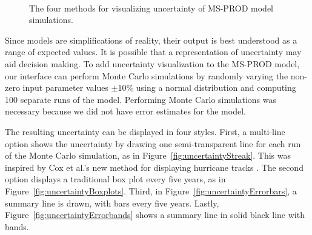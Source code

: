 \begin{figure}
\centering
	 \qquad
	 
	 \\
	
	  \qquad
	
	
	\caption{The four methods for visualizing uncertainty of MS-PROD model simulations.}
	\label{fig:uncertainty}
\end{figure}

Since models are simplifications of reality, their output is best understood as a range of expected values.  It is possible that a representation of uncertainty may aid decision making.  To add uncertainty visualization to the MS-PROD model, our interface can perform Monte Carlo simulations by randomly varying the non-zero input parameter values $\pm 10\%$ using a normal distribution and computing 100 separate runs of the model.  Performing Monte Carlo simulations was necessary because we did not have error estimates for the model.

The resulting uncertainty can be displayed in four styles.  First, a multi-line option shows the uncertainty by drawing one semi-transparent line for each run of the Monte Carlo simulation, as in Figure~\ref{fig:uncertaintyStreak}. This was inspired by Cox et al.'s new method for displaying hurricane tracks \cite{cox2013}.  The second option displays a traditional box plot every five years, as in Figure~\ref{fig:uncertaintyBoxplots}.  Third, in Figure~\ref{fig:uncertaintyErrorbars}, a summary line is drawn, with bars every five years.  Lastly, Figure~\ref{fig:uncertaintyErrorbands} shows a summary line in solid black line with bands.

